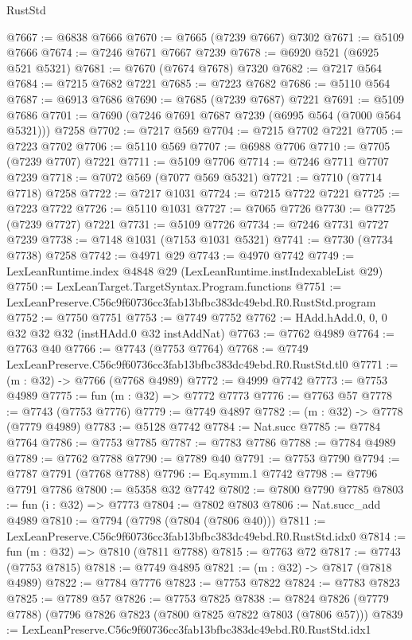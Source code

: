 \begin{lexlean}{RustStd}
\begin{coremodule}
@7667 := @6838 @7666
@7670 := @7665 (@7239 @7667) @7302
@7671 := @5109 @7666
@7674 := @7246 @7671 @7667 @7239
@7678 := @6920 @521 (@6925 @521 @5321)
@7681 := @7670 (@7674 @7678) @7320
@7682 := @7217 @564
@7684 := @7215 @7682 @7221
@7685 := @7223 @7682
@7686 := @5110 @564
@7687 := @6913 @7686
@7690 := @7685 (@7239 @7687) @7221
@7691 := @5109 @7686
@7701 := @7690 (@7246 @7691 @7687 @7239 (@6995 @564 (@7000 @564 @5321))) @7258
@7702 := @7217 @569
@7704 := @7215 @7702 @7221
@7705 := @7223 @7702
@7706 := @5110 @569
@7707 := @6988 @7706
@7710 := @7705 (@7239 @7707) @7221
@7711 := @5109 @7706
@7714 := @7246 @7711 @7707 @7239
@7718 := @7072 @569 (@7077 @569 @5321)
@7721 := @7710 (@7714 @7718) @7258
@7722 := @7217 @1031
@7724 := @7215 @7722 @7221
@7725 := @7223 @7722
@7726 := @5110 @1031
@7727 := @7065 @7726
@7730 := @7725 (@7239 @7727) @7221
@7731 := @5109 @7726
@7734 := @7246 @7731 @7727 @7239
@7738 := @7148 @1031 (@7153 @1031 @5321)
@7741 := @7730 (@7734 @7738) @7258
@7742 := @4971 @29
@7743 := @4970 @7742
@7749 := LexLeanRuntime.index @4848 @29 (LexLeanRuntime.instIndexableList @29)
@7750 := LexLeanTarget.TargetSyntax.Program.functions
@7751 := LexLeanPreserve.C56c9f60736cc3fab13bfbc383dc49ebd.R0.RustStd.program
@7752 := @7750 @7751
@7753 := @7749 @7752
@7762 := HAdd.hAdd.{0, 0, 0} @32 @32 @32 (instHAdd.{0} @32 instAddNat)
@7763 := @7762 @4989
@7764 := @7763 @40
@7766 := @7743 (@7753 @7764)
@7768 := @7749 LexLeanPreserve.C56c9f60736cc3fab13bfbc383dc49ebd.R0.RustStd.tl0
@7771 := (m : @32) -> @7766 (@7768 @4989)
@7772 := @4999 @7742
@7773 := @7753 @4989
@7775 := fun (m : @32) => @7772 @7773
@7776 := @7763 @57
@7778 := @7743 (@7753 @7776)
@7779 := @7749 @4897
@7782 := (m : @32) -> @7778 (@7779 @4989)
@7783 := @5128 @7742
@7784 := Nat.succ
@7785 := @7784 @7764
@7786 := @7753 @7785
@7787 := @7783 @7786
@7788 := @7784 @4989
@7789 := @7762 @7788
@7790 := @7789 @40
@7791 := @7753 @7790
@7794 := @7787 @7791 (@7768 @7788)
@7796 := Eq.symm.{1} @7742
@7798 := @7796 @7791 @7786
@7800 := @5358 @32 @7742
@7802 := @7800 @7790 @7785
@7803 := fun (i : @32) => @7773
@7804 := @7802 @7803
@7806 := Nat.succ_add @4989
@7810 := @7794 (@7798 (@7804 (@7806 @40)))
@7811 := LexLeanPreserve.C56c9f60736cc3fab13bfbc383dc49ebd.R0.RustStd.idx0
@7814 := fun (m : @32) => @7810 (@7811 @7788)
@7815 := @7763 @72
@7817 := @7743 (@7753 @7815)
@7818 := @7749 @4895
@7821 := (m : @32) -> @7817 (@7818 @4989)
@7822 := @7784 @7776
@7823 := @7753 @7822
@7824 := @7783 @7823
@7825 := @7789 @57
@7826 := @7753 @7825
@7838 := @7824 @7826 (@7779 @7788) (@7796 @7826 @7823 (@7800 @7825 @7822 @7803 (@7806 @57)))
@7839 := LexLeanPreserve.C56c9f60736cc3fab13bfbc383dc49ebd.R0.RustStd.idx1

\end{coremodule}
\end{lexlean}
